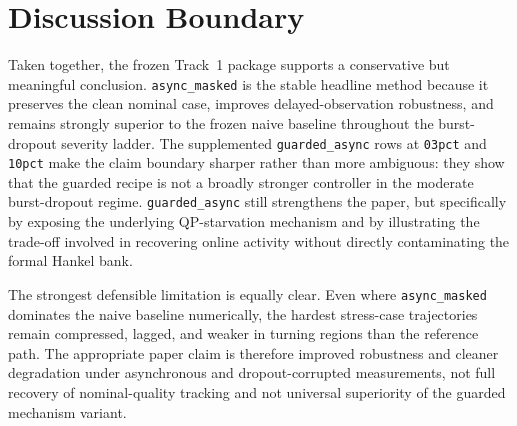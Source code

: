 \documentclass[12pt,a4paper]{article}
\begin{document}
\section{Discussion Boundary}

Taken together, the frozen Track~1 package supports a conservative but meaningful conclusion. \texttt{async\_masked} is the stable headline method because it preserves the clean nominal case, improves delayed-observation robustness, and remains strongly superior to the frozen naive baseline throughout the burst-dropout severity ladder. The supplemented \texttt{guarded\_async} rows at \texttt{03pct} and \texttt{10pct} make the claim boundary sharper rather than more ambiguous: they show that the guarded recipe is not a broadly stronger controller in the moderate burst-dropout regime. \texttt{guarded\_async} still strengthens the paper, but specifically by exposing the underlying QP-starvation mechanism and by illustrating the trade-off involved in recovering online activity without directly contaminating the formal Hankel bank.

The strongest defensible limitation is equally clear. Even where \texttt{async\_masked} dominates the naive baseline numerically, the hardest stress-case trajectories remain compressed, lagged, and weaker in turning regions than the reference path. The appropriate paper claim is therefore improved robustness and cleaner degradation under asynchronous and dropout-corrupted measurements, not full recovery of nominal-quality tracking and not universal superiority of the guarded mechanism variant.
\end{document}
